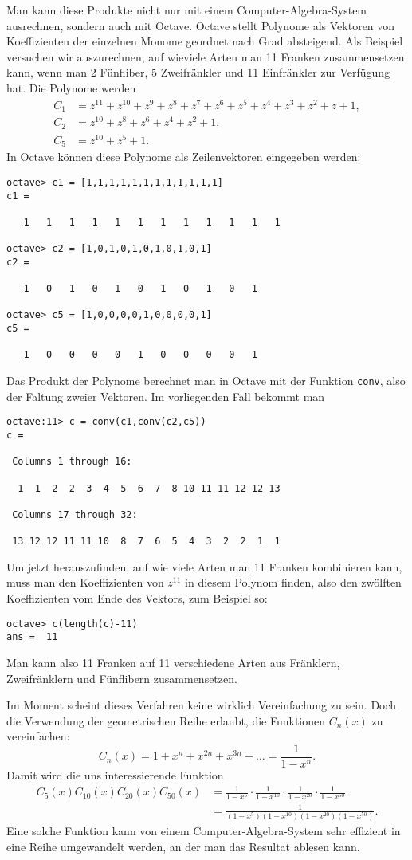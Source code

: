 Man kann diese Produkte nicht nur mit einem Computer-Algebra-System
ausrechnen, sondern auch mit Octave.
Octave stellt Polynome als
Vektoren von Koeffizienten der einzelnen Monome geordnet nach Grad
absteigend.
Als Beispiel versuchen wir auszurechnen, auf wieviele
Arten man 11 Franken zusammensetzen kann, wenn man 2 Fünfliber,
5 Zweifränkler und 11 Einfränkler zur Verfügung hat.
Die Polynome werden
\begin{align*}
C_1&=z^{11}+z^{10}+z^9+z^8+z^7+z^6+z^5+z^4+z^3+z^2+z+1,\\
C_2&=z^{10}+z^8+z^6+z^4+z^2+1,\\
C_5&=z^{10}+z^5+1.
\end{align*}
In Octave können diese Polynome als Zeilenvektoren eingegeben werden:
\begin{verbatim}
octave> c1 = [1,1,1,1,1,1,1,1,1,1,1,1]
c1 =

   1   1   1   1   1   1   1   1   1   1   1   1

octave> c2 = [1,0,1,0,1,0,1,0,1,0,1]
c2 =

   1   0   1   0   1   0   1   0   1   0   1

octave> c5 = [1,0,0,0,0,1,0,0,0,0,1]
c5 =

   1   0   0   0   0   1   0   0   0   0   1
\end{verbatim}
Das Produkt der Polynome berechnet man in Octave mit der Funktion
{\tt conv}, also der Faltung zweier Vektoren.
Im vorliegenden Fall bekommt man
\begin{verbatim}
octave:11> c = conv(c1,conv(c2,c5))
c =

 Columns 1 through 16:

  1  1  2  2  3  4  5  6  7  8 10 11 11 12 12 13

 Columns 17 through 32:

 13 12 12 11 11 10  8  7  6  5  4  3  2  2  1  1
\end{verbatim}
Um jetzt herauszufinden, auf wie viele Arten man 11 Franken
kombinieren kann, muss man den Koeffizienten von $z^{11}$ in diesem
Polynom finden, also den zwölften Koeffizienten vom Ende des
Vektors, zum Beispiel so:
\begin{verbatim}
octave> c(length(c)-11)
ans =  11
\end{verbatim}
Man kann also 11 Franken auf 11 verschiedene Arten aus Fränklern,
Zweifränklern und Fünflibern zusammensetzen.

Im Moment scheint dieses Verfahren keine wirklich Vereinfachung
zu sein.
Doch die Verwendung der geometrischen Reihe erlaubt, die
Funktionen $C_n(x)$ zu vereinfachen:
\[
C_n(x)=1+x^n+x^{2n}+x^{3n}+\dots = \frac1{1-x^n}.
\]
Damit wird die uns interessierende Funktion
\begin{align*}
C_5(x) C_{10}(x) C_{20}(x) C_{50}(x)
&=
\frac1{1-x^5}\cdot
\frac1{1-x^{10}}\cdot
\frac1{1-x^{20}}\cdot
\frac1{1-x^{50}}
\\
&=
\frac1{
(1-x^5)
(1-x^{10})
(1-x^{20})
(1-x^{50})
}.
\end{align*}
Eine solche Funktion kann von einem Computer-Algebra-System sehr effizient
in eine Reihe umgewandelt werden, an der man das Resultat ablesen kann.

